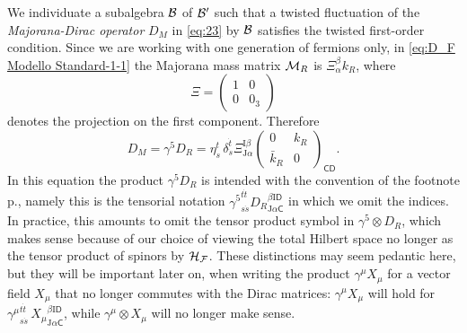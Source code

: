 \documentclass[11pt]{article}
\newcommand{\sI}{\mathrm  I}
\newcommand{\sJ}{\mathrm J}
\newcommand{\sC}{\mathsf C}
\newcommand{\sD}{\mathsf D}
\begin{document}
We individuate a subalgebra $\cal B$ of $\cal B'$ such that a twisted
fluctuation of the \emph{Majorana-Dirac operator} $D_M$ in
\eqref{eq:23} by ${\cal B}$ satisfies the twisted first-order
condition. Since we are working with one generation of fermions only,
in \eqref{eq:D_F  Modello Standard-1-1}
the Majorana mass matrix ${\cal M}_R$ is $ \Xi_{\alpha}^{\beta} k_R$, where 
 \begin{equation}
  \label{eq:80}
  \Xi =\left(\begin{array}{cc}
1 &0 \\ 0 &0_3 \end{array}\right)
\end{equation}
denotes the projection on the first component. Therefore
\begin{equation}
\label{majoranadiracoperator}
D_M = \gamma^5 D_R = \eta_s^t\,\delta_{\dot s}^{\dot t} \Xi_{\sJ\alpha}^{\sI\beta} \left(\begin{array}{cc} 0 & k_R \\ \bar k_R& 0\end{array}\right)_{\sC\sD}.
\end{equation}
In this equation the product
$\gamma^5 D_R$ is intended with the convention of the footnote
p.\pageref{footnotenotations}, namely this is the tensorial notation
${\gamma^5}_{s\dot s}^{t\dot t} {D_R}_{\sJ\alpha\sC}^{\beta\sI\sD}$ in which we omit the indices.
In practice, this amounts to omit the tensor product symbol in
$\gamma^5\otimes D_R$, which
makes sense because of our choice of viewing the total Hilbert space
no longer as the tensor product of spinors by $\cal H_F$. These
distinctions may
seem pedantic here, but they will be important later on, when writing the
product $\gamma^\mu X_\mu$ for a vector field $X_\mu$ that 
no longer commutes with the Dirac matrices:  $\gamma^\mu X_\mu$ will
hold for ${\gamma^\mu}_{s\dot s}^{t\dot t}\, {X_\mu}_{\sJ\alpha\sC}^{\beta\sI\sD}$, while $\gamma^\mu\otimes X_\mu$
will no longer make sense.
\end{document}
